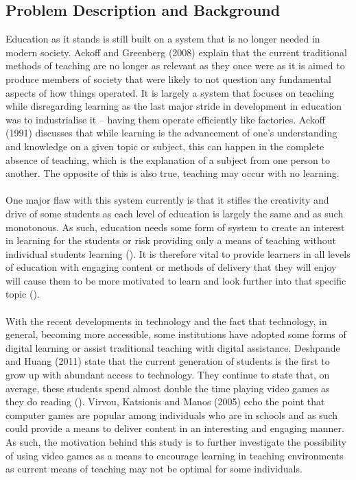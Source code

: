 \subsection{Problem Description and Background}
Education as it stands is still built on a system that is no longer needed in modern society. Ackoff and Greenberg (2008) explain that the current traditional methods of teaching are no longer as relevant as they once were as it is aimed to produce members of society that were likely to not question any fundamental aspects of how things operated. It is largely a system that focuses on teaching while disregarding learning as the last major stride in development in education was to industrialise it – having them operate efficiently like factories. Ackoff (1991) discusses that while learning is the advancement of one’s understanding and knowledge on a given topic or subject, this can happen in the complete absence of teaching, which is the explanation of a subject from one person to another. The opposite of this is also true, teaching may occur with no learning.
\\\\
One major flaw with this system currently is that it stifles the creativity and drive of some students as each level of education is largely the same and as such monotonous. As such, education needs some form of system to create an interest in learning for the students or risk providing only a means of teaching without individual students learning (\cite{Ackoff2008}). It is therefore vital to provide learners in all levels of education with engaging content or methods of delivery that they will enjoy will cause them to be more motivated to learn and look further into that specific topic (\cite{Ackoff2008}). 
\\\\
With the recent developments in technology and the fact that technology, in general, becoming more accessible, some institutions have adopted some forms of digital learning or assist traditional teaching with digital assistance. Deshpande and Huang (2011) state that the current generation of students is the first to grow up with abundant access to technology. They continue to state that, on average, these students spend almost double the time playing video games as they do reading (\cite{Deshpande2011}). Virvou, Katsionis and Manos (2005) echo the point that computer games are popular among individuals who are in schools and as such could provide a means to deliver content in an interesting and engaging manner. As such, the motivation behind this study is to further investigate the possibility of using video games as a means to encourage learning in teaching environments as current means of teaching may not be optimal for some individuals. 

